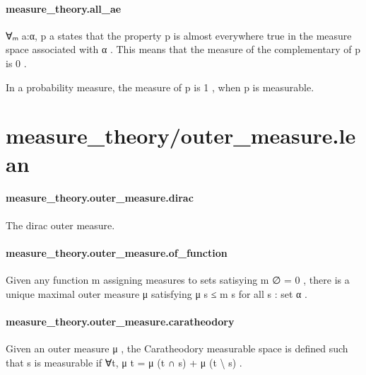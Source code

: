 \documentclass{article}
\begin{document}
\paragraph{measure\_theory.all\_ae}
\par
\colorbox[RGB]{253,246,227}{{{{\color[RGB]{101, 123, 131} ∀ₘ a:α, p a }}}} states that the property 
\colorbox[RGB]{253,246,227}{{{{\color[RGB]{101, 123, 131} p }}}} is almost everywhere true in the measure space
associated with 
\colorbox[RGB]{253,246,227}{{{{\color[RGB]{101, 123, 131} α }}}}. This means that the measure of the complementary of 
\colorbox[RGB]{253,246,227}{{{{\color[RGB]{101, 123, 131} p }}}} is 
\colorbox[RGB]{253,246,227}{{{{\color[RGB]{108, 113, 196} 0 }}}}.
\par
In a probability measure, the measure of 
\colorbox[RGB]{253,246,227}{{{{\color[RGB]{101, 123, 131} p }}}} is 
\colorbox[RGB]{253,246,227}{{{{\color[RGB]{108, 113, 196} 1 }}}}, when 
\colorbox[RGB]{253,246,227}{{{{\color[RGB]{101, 123, 131} p }}}} is measurable.
\section{measure\_theory/outer\_measure.lean}\paragraph{measure\_theory.outer\_measure.dirac}
\par
The dirac outer measure.
\paragraph{measure\_theory.outer\_measure.of\_function}
\par
Given any function 
\colorbox[RGB]{253,246,227}{{{{\color[RGB]{101, 123, 131} m }}}} assigning measures to sets satisying 
\colorbox[RGB]{253,246,227}{{{{\color[RGB]{101, 123, 131} m ∅  }}}{{{\color[RGB]{181, 137, 0} = }}}{{{\color[RGB]{101, 123, 131}   }}}{{{\color[RGB]{108, 113, 196} 0 }}}}, there is
a unique maximal outer measure 
\colorbox[RGB]{253,246,227}{{{{\color[RGB]{101, 123, 131} μ }}}} satisfying 
\colorbox[RGB]{253,246,227}{{{{\color[RGB]{101, 123, 131} μ s  }}}{{{\color[RGB]{181, 137, 0} ≤ }}}{{{\color[RGB]{101, 123, 131}  m s }}}} for all 
\colorbox[RGB]{253,246,227}{{{{\color[RGB]{101, 123, 131} s : set α }}}}.
\paragraph{measure\_theory.outer\_measure.caratheodory}
\par
Given an outer measure 
\colorbox[RGB]{253,246,227}{{{{\color[RGB]{101, 123, 131} μ }}}}, the Caratheodory measurable space is
defined such that 
\colorbox[RGB]{253,246,227}{{{{\color[RGB]{101, 123, 131} s }}}} is measurable if 
\colorbox[RGB]{253,246,227}{{{{\color[RGB]{101, 123, 131} ∀t, μ t  }}}{{{\color[RGB]{181, 137, 0} = }}}{{{\color[RGB]{101, 123, 131}  μ (t ∩ s)  }}}{{{\color[RGB]{181, 137, 0} + }}}{{{\color[RGB]{101, 123, 131}  μ (t \textbackslash{} s) }}}}.
\end{document}
